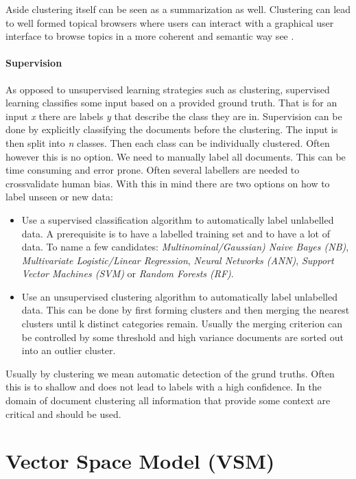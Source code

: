   Aside clustering itself can be seen as a summarization as well. Clustering can lead to well formed topical browsers where users can interact with a graphical user interface to browse topics in a more coherent and semantic way see \cite{Carrot2Search2003}.

  \paragraph{Supervision}

    As opposed to unsupervised learning strategies such as clustering, supervised learning classifies some input based on a provided ground truth. That is for an input \emph{x} there are labels \emph{y} that describe the class they are in. Supervision can be done by explicitly classifying the documents before the clustering. The input is then split into \emph{n} classes. Then each class can be individually clustered. Often however this is no option. We need to manually label all documents. This can be time consuming and error prone. Often several labellers are needed to crossvalidate human bias.
    With this in mind there are two options on how to label unseen or new data:

      \begin{itemize}
        \item Use a supervised classification algorithm to automatically label unlabelled data. A prerequisite is to have a labelled training set and to have a lot of data. To name a few candidates: \emph{Multinominal/Gaussian) Naive Bayes (NB)}, \emph{Multivariate Logistic/Linear Regression}, \emph{Neural Networks (ANN)}, \emph{Support Vector Machines (SVM)} or \emph{Random Forests (RF)}.
        \item Use an unsupervised clustering algorithm to automatically label unlabelled data. This can be done by first forming clusters and then merging the nearest clusters until k distinct categories remain. Usually the merging criterion can be controlled by some threshold and high variance documents are sorted out into an outlier cluster.
      \end{itemize}

    Usually by clustering we mean automatic detection of the grund truths. Often this is to shallow and does not lead to labels with a high confidence. In the domain of document clustering all information that provide some context are critical and should be used.

\newpage{}
\section{Vector Space Model (VSM)}
  
